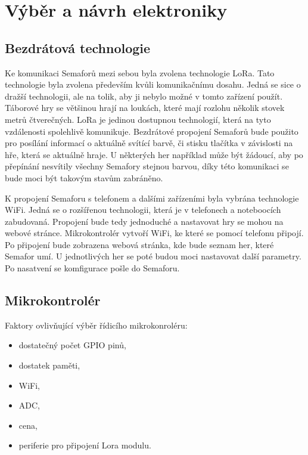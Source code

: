 \chapter{Výběr a návrh elektroniky}

\section{Bezdrátová technologie}
Ke komunikaci Semaforů mezi sebou byla zvolena technologie LoRa. Tato technologie byla zvolena především kvůli komunikačnímu dosahu. Jedná se sice o dražší technologii, 
ale na tolik, aby ji nebylo možné v tomto zařízení použít. Táborové hry se většinou hrají na loukách, které mají rozlohu několik stovek metrů čtverečných. LoRa je jedinou
dostupnou technologií, která na tyto vzdálenosti spolehlivě komunikuje. Bezdrátové propojení Semaforů bude použito pro posílání informací o aktuálně svítící barvě, či 
stisku tlačítka v závislosti na hře, která se aktuálně hraje. U některých her například může být žádoucí, aby po přepínání nesvítily všechny Semafory stejnou barvou,
díky této komunikaci se bude moci být takovým stavům zabráněno. 

K propojení Semaforu s telefonem a dalšími zařízeními byla vybrána technologie WiFi. Jedná se o rozšířenou technologii, která je v telefonech a noteboocích zabudovaná. 
Propojení bude tedy jednoduché a nastavovat hry se mohou na webové stránce. Mikrokontrolér vytvoří WiFi, ke které se pomocí telefonu připojí. Po připojení bude zobrazena
webová stránka, kde bude seznam her, které Semafor umí. U jednotlivých her se poté budou moci nastavovat další parametry. Po nasatvení se komfigurace pošle do Semaforu. 

\section{Mikrokontrolér}
Faktory ovlivňující výběr řídicího mikrokonroléru:
\begin{itemize}
  \item dostatečný počet GPIO pinů,
  \item dostatek paměti,
  \item WiFi,
  \item ADC,
  \item cena,
  \item periferie pro připojení Lora modulu.
\end{itemize}

